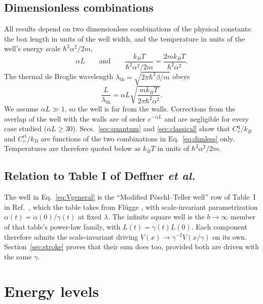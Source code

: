 \documentclass[11pt]{article}
\numberwithin{equation}{section}
\newcommand{\lth}{\lambda_{\mathrm{th}}}
\newcommand{\Cq}{C_v^{\mathrm{q}}}
\newcommand{\Ccl}{C_v^{\mathrm{cl}}}
\newcommand{\kB}{k_{B}}
\begin{document}
\subsection{Dimensionless combinations}
All results depend on two dimensionless combinations of the physical constants: the box length in units of the well width, and the temperature in units of the well's energy scale $\hbar^2\alpha^2/2m$,
\begin{equation}
\alpha L\qquad\text{and}\qquad\frac{\kB T}{\hbar^2\alpha^2/2m}=\frac{2m\kB T}{\hbar^2\alpha^2}.
\label{eq:dimless}
\end{equation}
The thermal de Broglie wavelength $\lth=\sqrt{2\pi\hbar^2\beta/m}$ obeys
\begin{equation}
\frac{L}{\lth}=\alpha L\sqrt{\frac{m\kB T}{2\pi\hbar^2\alpha^2}}.
\label{eq:Llth}
\end{equation}
We assume $\alpha L\gg1$, so the well is far from the walls. Corrections from the overlap of the well with the walls are of order $e^{-\alpha L}$ and are negligible for every case studied ($\alpha L\ge30$). Secs.~\ref{sec:quantum} and \ref{sec:classical} show that $\Cq/\kB$ and $\Ccl/\kB$ are functions of the two combinations in Eq.~\eqref{eq:dimless} only. Temperatures are therefore quoted below as $\kB T$ in units of $\hbar^2\alpha^2/2m$.

\subsection{Relation to Table I of Deffner \emph{et al.}}
The well in Eq.~\eqref{eq:Vgeneral} is the ``Modified P\"oschl--Teller well'' row of Table~I in Ref.~\cite{deffner2014}, which the table takes from Fl\"ugge \cite{flugge1971}, with scale-invariant parametrization $\alpha(t)=\alpha(0)/\gamma(t)$ at fixed $\lambda$. The infinite square well is the $b\to\infty$ member of that table's power-law family, with $L(t)=\gamma(t)L(0)$. Each component therefore admits the scale-invariant driving $V(x)\to\gamma^{-2}V(x/\gamma)$ on its own. Section~\ref{sec:stroke} proves that their sum does too, provided both are driven with the same $\gamma$.

\section{Energy levels}
\label{sec:levels}
\end{document}
